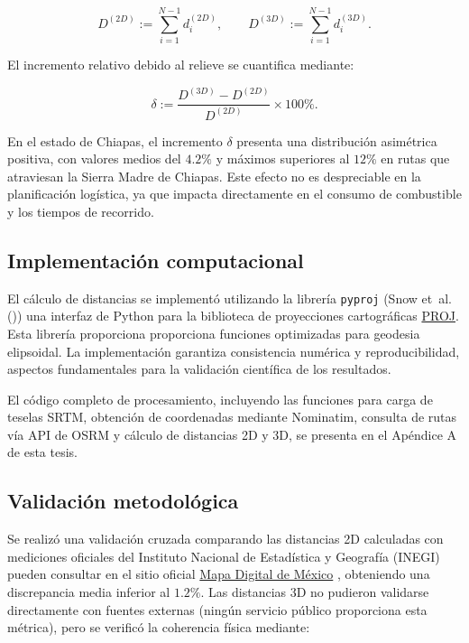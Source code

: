 \documentclass[
  spanish,
  us-letterpaper,
]{scrreprt}
\numberwithin{equation}{section}
\begin{document}
\[
D^{(2D)} := \sum_{i=1}^{N-1} d_i^{(2D)}, \qquad
D^{(3D)} := \sum_{i=1}^{N-1} d_i^{(3D)}.
\]

El incremento relativo debido al relieve se cuantifica mediante:

\[
\delta := \frac{D^{(3D)} - D^{(2D)}}{D^{(2D)}} \times 100\%.
\]

En el estado de Chiapas, el incremento \(\delta\) presenta una
distribución asimétrica positiva, con valores medios del \(4.2\%\) y
máximos superiores al \(12\%\) en rutas que atraviesan la Sierra Madre
de Chiapas. Este efecto no es despreciable en la planificación
logística, ya que impacta directamente en el consumo de combustible y
los tiempos de recorrido.

\subsection{Implementación
computacional}\label{implementaciuxf3n-computacional-1}

El cálculo de distancias se implementó utilizando la librería
\texttt{pyproj} (Snow et~al. ()) una
interfaz de Python para la biblioteca de proyecciones cartográficas
\href{https://pyproj4.github.io/pyproj/stable/}{PROJ}. Esta librería
proporciona proporciona funciones optimizadas para geodesia elipsoidal.
La implementación garantiza consistencia numérica y reproducibilidad,
aspectos fundamentales para la validación científica de los resultados.

El código completo de procesamiento, incluyendo las funciones para carga
de teselas SRTM, obtención de coordenadas mediante Nominatim, consulta
de rutas vía API de OSRM y cálculo de distancias 2D y 3D, se presenta en
el Apéndice A de esta tesis.

\subsection{Validación
metodológica}\label{validaciuxf3n-metodoluxf3gica}

Se realizó una validación cruzada comparando las distancias 2D
calculadas con mediciones oficiales del Instituto Nacional de
Estadística y Geografía (INEGI) pueden consultar en el sitio oficial
\href{https://gaia.inegi.org.mx/mdm6/}{Mapa Digital de México} ,
obteniendo una discrepancia media inferior al \(1.2\%\). Las distancias
3D no pudieron validarse directamente con fuentes externas (ningún
servicio público proporciona esta métrica), pero se verificó la
coherencia física mediante:
\end{document}
